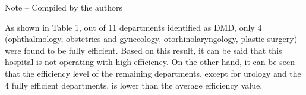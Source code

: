 
Note -- Compiled by the authors

As shown in Table 1, out of 11 departments identified as DMD, only 4
(ophthalmology, obstetrics and gynecology, otorhinolaryngology, plastic
surgery) were found to be fully efficient. Based on this result, it can
be said that this hospital is not operating with high efficiency. On the
other hand, it can be seen that the efficiency level of the remaining
departments, except for urology and the 4 fully efficient departments,
is lower than the average efficiency value.

